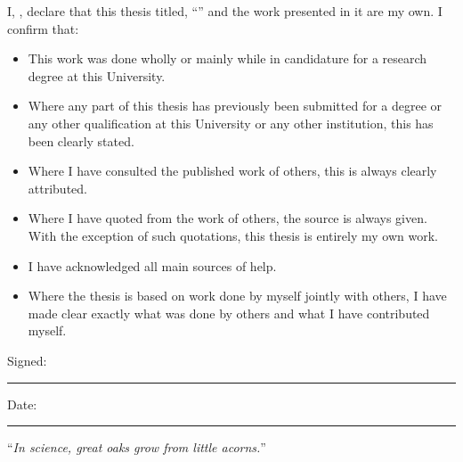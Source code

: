 \documentclass[
11pt, %
english, %
singlespacing, %
headsepline, %
]{MastersDoctoralThesis} %
\begin{document}

\begin{declaration}
\addchaptertocentry{\authorshipname} %
\noindent I, \authorname, declare that this thesis titled, \enquote{\ttitle} and the work presented in it are my own. I confirm that:

\begin{itemize} 
\item This work was done wholly or mainly while in candidature for a research degree at this University.
\item Where any part of this thesis has previously been submitted for a degree or any other qualification at this University or any other institution, this has been clearly stated.
\item Where I have consulted the published work of others, this is always clearly attributed.
\item Where I have quoted from the work of others, the source is always given. With the exception of such quotations, this thesis is entirely my own work.
\item I have acknowledged all main sources of help.
\item Where the thesis is based on work done by myself jointly with others, I have made clear exactly what was done by others and what I have contributed myself.\\
\end{itemize}

 
\noindent Signed:\\
\rule[0.5em]{25em}{0.5pt} %
 
\noindent Date:\\
\rule[0.5em]{25em}{0.5pt} %
\end{declaration}


\cleardoublepage


\vspace*{0.2\textheight}

\noindent\enquote{\itshape In science, great oaks grow from little acorns.}\bigbreak
\end{document}
